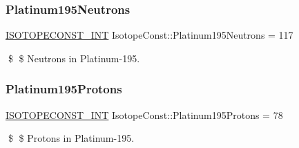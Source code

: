 \subsubsection{\texorpdfstring{Platinum195\+Neutrons}{Platinum195Neutrons}}
{\footnotesize\ttfamily \mbox{\hyperlink{group___isotope_const-_macros_ga5f18360b3e99483a35c32d789e62621c}{I\+S\+O\+T\+O\+P\+E\+C\+O\+N\+S\+T\+\_\+\+I\+NT}} Isotope\+Const\+::\+Platinum195\+Neutrons = 117}

\$ \$ Neutrons in Platinum-\/195. \mbox{\label{group___isotope_const-_platinum-_pt195_ga3d4873ede182026095f4f5317e694c32}} 
\subsubsection{\texorpdfstring{Platinum195\+Protons}{Platinum195Protons}}
{\footnotesize\ttfamily \mbox{\hyperlink{group___isotope_const-_macros_ga5f18360b3e99483a35c32d789e62621c}{I\+S\+O\+T\+O\+P\+E\+C\+O\+N\+S\+T\+\_\+\+I\+NT}} Isotope\+Const\+::\+Platinum195\+Protons = 78}

\$ \$ Protons in Platinum-\/195. 